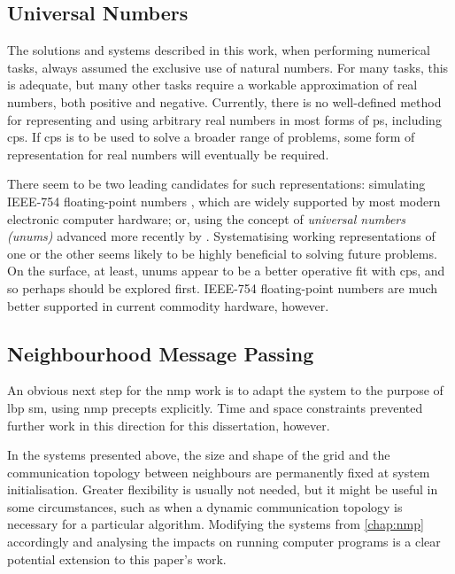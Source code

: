 
\subsection{Universal Numbers}

The solutions and systems described in this work, when performing numerical tasks, always assumed the exclusive use of natural numbers.  For many tasks, this is adequate, but many other tasks require a workable approximation of real numbers, both positive and negative.  Currently, there is no well-defined method for representing and using arbitrary real numbers in most forms of \gls{ps}, including \gls{cps}.  If \gls{cps} is to be used to solve a broader range of problems, some form of representation for real numbers will eventually be required.

There seem to be two leading candidates for such representations:  simulating IEEE-754 floating-point numbers \cite{ieee754}, which are widely supported by most modern electronic computer hardware;  or, using the concept of \emph{universal numbers (unums)} advanced more recently by \citeauthor{Gustafson2017} \cite{Gustafson2017}.  Systematising working representations of one or the other seems likely to be highly beneficial to solving future problems.  On the surface, at least, unums appear to be a better operative fit with \gls{cps}, and so perhaps should be explored first.  IEEE-754 floating-point numbers are much better supported in current commodity hardware, however.


\subsection{Neighbourhood Message Passing}
An obvious next step for the \gls{nmp} work is to adapt the system to the purpose of \gls{lbp} \gls{sm}, using \gls{nmp} precepts explicitly.  Time and space constraints prevented further work in this direction for this dissertation, however.

In the systems presented above, the size and shape of the grid and the communication topology between neighbours are permanently fixed at system initialisation.  Greater flexibility is usually not needed, but it might be useful in some circumstances, such as when a dynamic communication topology is necessary for a particular algorithm.  Modifying the systems from \cref{chap:nmp} accordingly and analysing the impacts on running computer programs is a clear potential extension to this paper's work.


